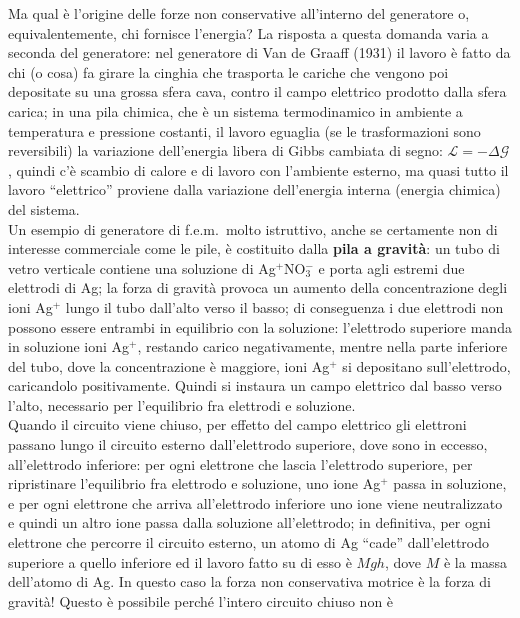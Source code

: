 Ma qual \`e l'origine delle forze non conservative all'interno del generatore o,
equivalentemente, chi fornisce l'energia? La risposta a questa domanda varia a
seconda del generatore: nel generatore di Van de Graaff (1931) il lavoro \`e
fatto da chi (o cosa) fa girare la cinghia che trasporta le cariche che vengono
poi depositate su una grossa sfera cava, contro il campo elettrico prodotto
dalla sfera carica; in una pila chimica, che \`e un sistema termodinamico in
ambiente a temperatura e pressione costanti, il lavoro eguaglia (se le
trasformazioni sono reversibili) la variazione dell'energia libera di Gibbs
cambiata di segno: $\mathcal L=-\Delta\mathcal G$, quindi c'\`e scambio di
calore e di lavoro con l'ambiente esterno, ma quasi tutto il lavoro
``elettrico'' proviene dalla variazione dell'energia interna (energia chimica)
del sistema.\\
Un esempio di generatore di f.e.m.\ molto istruttivo, anche se certamente non di
interesse commerciale come le pile, \`e costituito dalla \textbf{pila a
gravit\`a}: un tubo di vetro verticale contiene una soluzione di Ag$^+$NO$_3^-$
e porta agli estremi due elettrodi di Ag; la forza di gravit\`a provoca un
aumento della concentrazione degli ioni Ag$^+$ lungo il tubo dall'alto verso il
basso; di conseguenza i due elettrodi non possono essere entrambi in equilibrio
con la soluzione: l'elettrodo superiore manda in soluzione ioni Ag$^+$, restando
carico negativamente, mentre nella parte inferiore del tubo, dove la
concentrazione \`e maggiore, ioni Ag$^+$ si depositano sull'elettrodo,
caricandolo positivamente. Quindi si instaura un campo elettrico dal basso verso
l'alto, necessario per l'equilibrio fra elettrodi e soluzione.\\
Quando il circuito viene chiuso, per effetto del campo elettrico gli elettroni
passano lungo il circuito esterno dall'elettrodo superiore, dove sono in
eccesso, all'elettrodo inferiore: per ogni elettrone che lascia l'elettrodo
superiore, per ripristinare l'equilibrio fra elettrodo e soluzione, uno ione
Ag$^+$ passa in soluzione, e per ogni elettrone che arriva all'elettrodo
inferiore uno ione viene neutralizzato e quindi un altro ione passa dalla
soluzione all'elettrodo; in definitiva, per ogni elettrone che percorre il
circuito esterno, un atomo di Ag ``cade'' dall'elettrodo superiore a quello
inferiore ed il lavoro fatto su di esso \`e $Mgh$, dove $M$ \`e la massa
dell'atomo di Ag. In questo caso la forza non conservativa motrice \`e la forza
di gravit\`a! Questo \`e possibile perch\'e l'intero circuito chiuso non \`e
